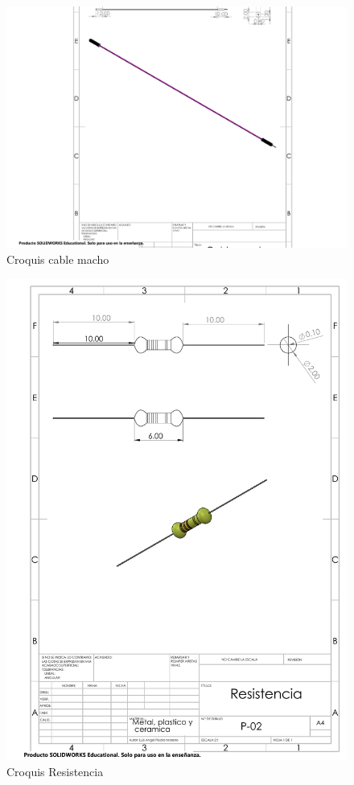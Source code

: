     \begin{figure}[H]
        \centering
        \includegraphics[trim = {10mm 10mm 10mm 10mm},clip,scale=0.5]{23/img/Cable macho-hembra 5v..pdf}
        \caption{Croquis cable macho}
        \label{fig:lcd-16x2}
    \end{figure}
    \begin{figure}[H]
        \centering
        \includegraphics[trim = {10mm 10mm 10mm 10mm},clip,scale=0.2]{23/img/Resistencia.pdf}
        \caption{Croquis Resistencia}
        \label{fig:lcd-16x2}
    \end{figure}
